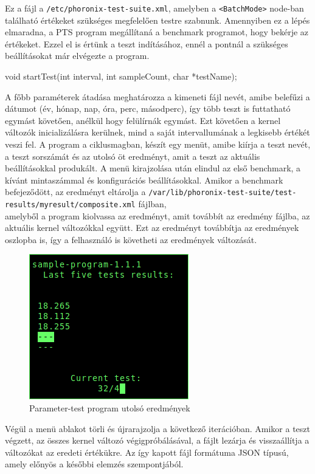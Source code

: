 Ez a fájl a \texttt{/etc/phoronix-test-suite.xml}, amelyben a \texttt{<BatchMode>} node-ban található értékeket szükséges megfelelően testre szabnunk. Amennyiben ez a lépés elmaradna, a PTS program megállítaná a benchmark programot, hogy bekérje az értékeket. Ezzel el is értünk a teszt indításához, ennél a pontnál a szükséges beállításokat már elvégezte a program.
\begin{cpp}
void startTest(int interval, int sampleCount, char *testName);
\end{cpp}
A főbb paraméterek átadása meghatározza a kimeneti fájl nevét, amibe belefűzi a dátumot (év, hónap, nap, óra, perc, másodperc), így több teszt is futtatható egymást követően, anélkül hogy felülírnák egymást.
Ezt követően a kernel változók inicializálásra kerülnek, mind a saját intervallumának a legkisebb értékét veszi fel. A program a ciklusmagban, készít egy menüt, amibe kiírja a teszt nevét, a teszt sorszámát és az utolsó öt eredményt, amit a teszt az aktuális beállításokkal produkált. A menü kirajzolása után elindul az első benchmark, a kívánt mintaszámmal és konfigurációs beállításokkal. Amikor a benchmark befejeződött, az eredményt eltárolja a \texttt{/var/lib/phoronix-test-suite/test-results/myresult/composite.xml} fájlban, \\ amelyből a program kiolvassa az eredményt, amit továbbít az eredmény fájlba, az aktuális kernel változókkal együtt. Ezt az eredményt továbbítja az eredmények oszlopba is, így a felhasználó is követheti az eredmények változását.

\begin{figure}[h!]
\centering
\includegraphics[scale=3.0]{images/parameter-test.png}
\caption{Parameter-test program utolsó eredmények}
\label{fig:parameter-test}
\end{figure}

Végül a menü ablakot törli és újrarajzolja a következő iterációban.
Amikor a teszt végzett, az összes kernel változó végigpróbálásával, a fájlt lezárja és visszaállítja a változókat az eredeti értékükre.
Az így kapott fájl formátuma JSON típusú, amely előnyös a későbbi elemzés szempontjából.

